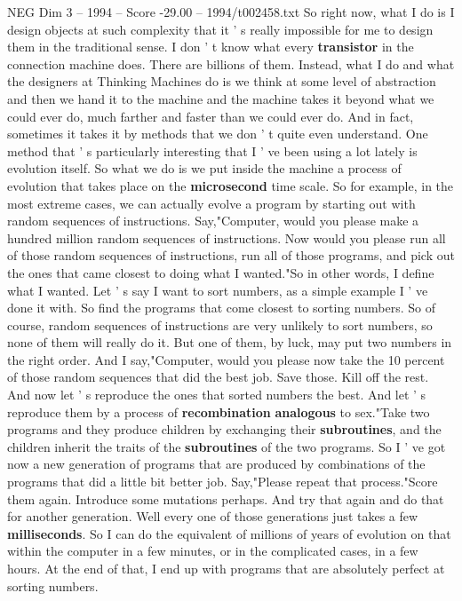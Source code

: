 \begin{textsample}{NEG Dim 3 – 1994 – Score -29.00 – 1994/t002458.txt}
So right now, what I do is I design objects at such complexity that it ' s really impossible for me to design them in the traditional sense.
I don ' t know what every \textbf{transistor} in the connection machine does.
There are billions of them.
Instead, what I do and what the designers at Thinking Machines do is we think at some level of abstraction and then we hand it to the machine and the machine takes it beyond what we could ever do, much farther and faster than we could ever do.
And in fact, sometimes it takes it by methods that we don ' t quite even understand.
One method that ' s particularly interesting that I ' ve been using a lot lately is evolution itself.
So what we do is we put inside the machine a process of evolution that takes place on the \textbf{microsecond} time scale.
So for example, in the most extreme cases, we can actually evolve a program by starting out with random sequences of instructions.
Say,"Computer, would you please make a hundred million random sequences of instructions.
Now would you please run all of those random sequences of instructions, run all of those programs, and pick out the ones that came closest to doing what I wanted."So in other words, I define what I wanted.
Let ' s say I want to sort numbers, as a simple example I ' ve done it with.
So find the programs that come closest to sorting numbers.
So of course, random sequences of instructions are very unlikely to sort numbers, so none of them will really do it.
But one of them, by luck, may put two numbers in the right order.
And I say,"Computer, would you please now take the 10 percent of those random sequences that did the best job.
Save those.
Kill off the rest.
And now let ' s reproduce the ones that sorted numbers the best.
And let ' s reproduce them by a process of \textbf{recombination} \textbf{analogous} to sex."Take two programs and they produce children by exchanging their \textbf{subroutines}, and the children inherit the traits of the \textbf{subroutines} of the two programs.
So I ' ve got now a new generation of programs that are produced by combinations of the programs that did a little bit better job.
Say,"Please repeat that process."Score them again.
Introduce some mutations perhaps.
And try that again and do that for another generation.
Well every one of those generations just takes a few \textbf{milliseconds}.
So I can do the equivalent of millions of years of evolution on that within the computer in a few minutes, or in the complicated cases, in a few hours.
At the end of that, I end up with programs that are absolutely perfect at sorting numbers.

\end{textsample}
